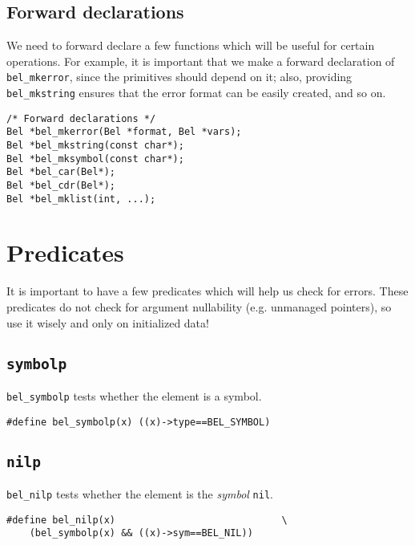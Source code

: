 \documentclass[openright,a4paper,twoside,12pt]{memoir}
\begin{document}
\subsection{Forward declarations}
\label{sec:org4115c52}

We need to forward declare a few functions which will be useful for
certain operations. For example, it is important that we make a
forward declaration of \texttt{bel\_mkerror}, since the primitives should depend
on it; also, providing \texttt{bel\_mkstring} ensures that the error format can
be easily created, and so on.

\begin{verbatim}
/* Forward declarations */
Bel *bel_mkerror(Bel *format, Bel *vars);
Bel *bel_mkstring(const char*);
Bel *bel_mksymbol(const char*);
Bel *bel_car(Bel*);
Bel *bel_cdr(Bel*);
Bel *bel_mklist(int, ...);
\end{verbatim}

\section{Predicates}
\label{sec:orgd37f592}

It is important to have a few predicates which will help us check for
errors. These predicates do not check for argument nullability
(e.g. unmanaged pointers), so use it wisely and only on initialized
data!

\subsection{\texttt{symbolp}}
\label{sec:orgc5f38f4}

\texttt{bel\_symbolp} tests whether the element is a symbol.

\begin{verbatim}
#define bel_symbolp(x) ((x)->type==BEL_SYMBOL)
\end{verbatim}

\subsection{\texttt{nilp}}
\label{sec:orga54798f}

\texttt{bel\_nilp} tests whether the element is the \emph{symbol} \texttt{nil}.

\begin{verbatim}
#define bel_nilp(x)                             \
    (bel_symbolp(x) && ((x)->sym==BEL_NIL))
\end{verbatim}
\end{document}
